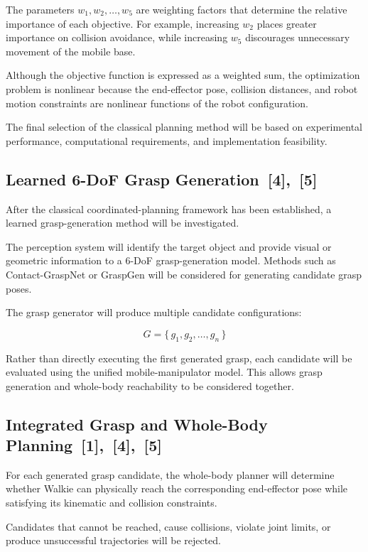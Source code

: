 \documentclass[12pt,a4paper]{article}
\begin{document}
The parameters $w_1, w_2, \ldots, w_5$ are weighting factors that determine the relative importance
of each objective. For example, increasing $w_2$ places greater importance on collision avoidance,
while increasing $w_5$ discourages unnecessary movement of the mobile base.

Although the objective function is expressed as a weighted sum, the optimization problem is
nonlinear because the end-effector pose, collision distances, and robot motion constraints are
nonlinear functions of the robot configuration.

The final selection of the classical planning method will be based on experimental performance,
computational requirements, and implementation feasibility.

\subsection*{Learned 6-DoF Grasp Generation~[4],~[5]}

After the classical coordinated-planning framework has been established, a learned
grasp-generation method will be investigated.

The perception system will identify the target object and provide visual or geometric
information to a 6-DoF grasp-generation model. Methods such as Contact-GraspNet or
GraspGen will be considered for generating candidate grasp poses.

The grasp generator will produce multiple candidate configurations:

\begin{equation}
G = \{\, g_1, g_2, \ldots, g_n \,\}
\end{equation}

Rather than directly executing the first generated grasp, each candidate will be evaluated using
the unified mobile-manipulator model. This allows grasp generation and whole-body
reachability to be considered together.

\subsection*{Integrated Grasp and Whole-Body Planning~[1],~[4],~[5]}

For each generated grasp candidate, the whole-body planner will determine whether Walkie
can physically reach the corresponding end-effector pose while satisfying its kinematic and
collision constraints.

Candidates that cannot be reached, cause collisions, violate joint limits, or produce unsuccessful
trajectories will be rejected.
\end{document}
